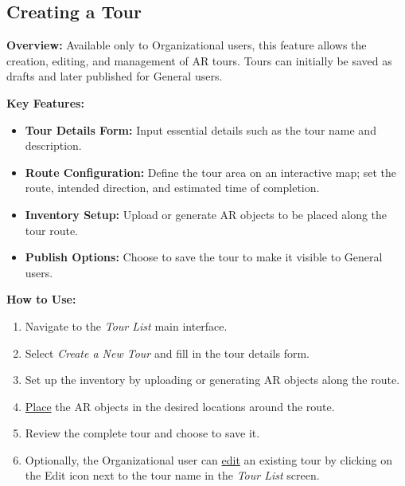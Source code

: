 \documentclass[12pt, titlepage]{article}
\begin{document}
\newpage
\subsection{Creating a Tour}
\textbf{Overview:} Available only to Organizational users, this feature allows the creation, editing, and management of AR tours. Tours can initially be saved as drafts and later published for General users.

\textbf{Key Features:}
\begin{itemize}[leftmargin=*]
    \item \textbf{Tour Details Form:} Input essential details such as the tour name and description.
    \item \textbf{Route Configuration:} Define the tour area on an interactive map; set the route, intended direction, and estimated time of completion.
    \item \textbf{Inventory Setup:} Upload or generate AR objects to be placed along the tour route.
    \item \textbf{Publish Options:} Choose to save the tour to make it visible to General users.
\end{itemize}

\textbf{How to Use:}
\begin{enumerate}[leftmargin=*]
    \item Navigate to the \emph{Tour List} main interface.
    \item Select \emph{Create a New Tour} and fill in the tour details form.
    \item Set up the inventory by uploading or generating AR objects along the route.
    \item \hyperref[fig:obj_place]{Place} the AR objects in the desired locations around the route.
    \item Review the complete tour and choose to save it.
    \item Optionally, the Organizational user can \hyperref[fig:edit_tour]{edit} an existing tour by clicking on the Edit icon next to the tour name in the \emph{Tour List} screen.
\end{enumerate}
\end{document}
